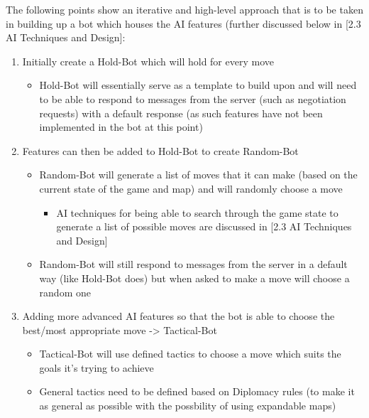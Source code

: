 \documentclass[12pt]{article}
\begin{document}
The following points show an iterative and high-level approach that
is to be taken in building up a bot which houses the AI features (further
discussed below in {[}2.3 AI Techniques and Design{]}:
\begin{enumerate}
\item Initially create a Hold-Bot which will hold for every move

\begin{itemize}
\item Hold-Bot will essentially serve as a template to build upon and will
need to be able to respond to messages from the server (such as negotiation
requests) with a default response (as such features have not been
implemented in the bot at this point)
\end{itemize}
\item Features can then be added to Hold-Bot to create Random-Bot

\begin{itemize}
\item Random-Bot will generate a list of moves that it can make (based on
the current state of the game and map) and will randomly choose a
move

\begin{itemize}
\item AI techniques for being able to search through the game state to generate
a list of possible moves are discussed in {[}2.3 AI Techniques and
Design{]}
\end{itemize}
\item Random-Bot will still respond to messages from the server in a default
way (like Hold-Bot does) but when asked to make a move will choose
a random one
\end{itemize}
\item Adding more advanced AI features so that the bot is able to choose
the best/most appropriate move -> Tactical-Bot

\begin{itemize}
\item Tactical-Bot will use defined tactics to choose a move which suits
the goals it's trying to achieve
\item General tactics need to be defined based on Diplomacy rules (to make
it as general as possible with the possbility of using expandable
maps)


\end{itemize}
\end{enumerate}
\end{document}
